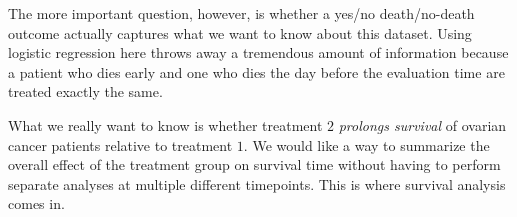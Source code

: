 The more important question, however, is whether a yes/no death/no-death outcome actually captures what we want to know about this dataset. Using logistic regression here throws away a tremendous amount of information because a patient who dies early and one who dies the day before the evaluation time are treated exactly the same. 

What we really want to know is whether treatment $2$ \emph{prolongs survival} of ovarian cancer patients relative to treatment $1$. We would like a way to summarize the overall effect of the treatment group on survival time without having to perform separate analyses at multiple different timepoints. This is where survival analysis comes in.